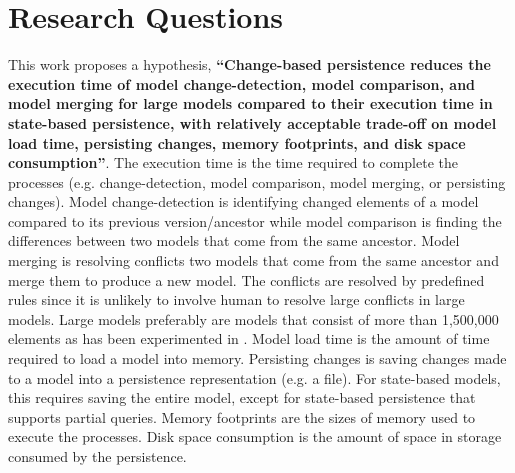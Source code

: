 \documentclass[12pt, a4paper]{report} \usepackage[titletoc]{appendix}
\begin{document}
\section{Research Questions}
\label{sec:research_questions}
This work proposes a hypothesis, \textbf{``Change-based persistence reduces the execution time of model change-detection, model comparison, and model merging for large models compared to their execution time in state-based persistence, with relatively acceptable trade-off on model load time, persisting changes, memory footprints, and disk space consumption''}. The execution time is the time required to complete the processes (e.g. change-detection, model comparison, model merging, or persisting changes). Model change-detection is identifying changed elements of a model compared to its previous version/ancestor while model comparison is finding the differences between two models that come from the same ancestor. Model merging is resolving conflicts two models that come from the same ancestor and merge them to produce a new model. The conflicts are resolved by predefined rules since it is unlikely to involve human to resolve large conflicts in large models. Large models preferably are models that consist of more than 1,500,000 elements as has been experimented in \cite{daniel2016neoemf,pagan2011morsa}. Model load time is the amount of time required to load a model into memory. Persisting changes is saving changes made to a model into a persistence representation (e.g. a file). For state-based models, this requires saving the entire model, except for state-based persistence that supports partial queries. Memory footprints are the sizes of memory used to execute the processes. Disk space consumption is the amount of space in storage consumed by the persistence.  
\end{document}
